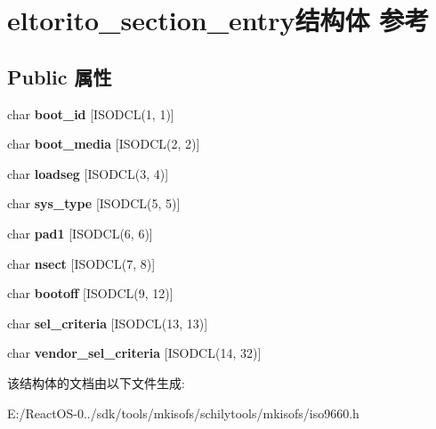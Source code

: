 \hypertarget{structeltorito__section__entry}{}\section{eltorito\+\_\+section\+\_\+entry结构体 参考}
\label{structeltorito__section__entry}
\subsection*{Public 属性}
\begin{DoxyCompactItemize}
\item 
\mbox{\label{structeltorito__section__entry_adaca0134de61f38a92e4bfec5a5fc78f}} 
char {\bfseries boot\+\_\+id} \mbox{[}I\+S\+O\+D\+CL(1, 1)\mbox{]}
\item 
\mbox{\label{structeltorito__section__entry_ac3289ace9b138cfcbda0cb83e682d936}} 
char {\bfseries boot\+\_\+media} \mbox{[}I\+S\+O\+D\+CL(2, 2)\mbox{]}
\item 
\mbox{\label{structeltorito__section__entry_a58354909f79cb2dcca280647e9e2619e}} 
char {\bfseries loadseg} \mbox{[}I\+S\+O\+D\+CL(3, 4)\mbox{]}
\item 
\mbox{\label{structeltorito__section__entry_af29568f3a29c2d043d6037fd135dd5ea}} 
char {\bfseries sys\+\_\+type} \mbox{[}I\+S\+O\+D\+CL(5, 5)\mbox{]}
\item 
\mbox{\label{structeltorito__section__entry_a87b29a8ee01ca96394b75d6f539fb6b7}} 
char {\bfseries pad1} \mbox{[}I\+S\+O\+D\+CL(6, 6)\mbox{]}
\item 
\mbox{\label{structeltorito__section__entry_a935eb84e941860b5ec22a7af1bcf8912}} 
char {\bfseries nsect} \mbox{[}I\+S\+O\+D\+CL(7, 8)\mbox{]}
\item 
\mbox{\label{structeltorito__section__entry_a8f00867af818f5c1e30b91631dd51399}} 
char {\bfseries bootoff} \mbox{[}I\+S\+O\+D\+CL(9, 12)\mbox{]}
\item 
\mbox{\label{structeltorito__section__entry_addb39636ca208704b85af59ae502ce91}} 
char {\bfseries sel\+\_\+criteria} \mbox{[}I\+S\+O\+D\+CL(13, 13)\mbox{]}
\item 
\mbox{\label{structeltorito__section__entry_a25595629a16cba36c281f882a36e9cab}} 
char {\bfseries vendor\+\_\+sel\+\_\+criteria} \mbox{[}I\+S\+O\+D\+CL(14, 32)\mbox{]}
\end{DoxyCompactItemize}


该结构体的文档由以下文件生成\+:\begin{DoxyCompactItemize}
\item 
E\+:/\+React\+O\+S-\/0../sdk/tools/mkisofs/schilytools/mkisofs/iso9660.\+h\end{DoxyCompactItemize}
